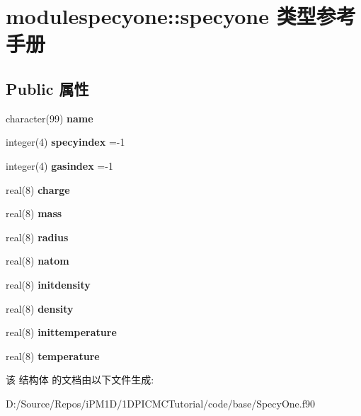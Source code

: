 \hypertarget{structmodulespecyone_1_1specyone}{}\section{modulespecyone\+::specyone 类型参考手册}
\label{structmodulespecyone_1_1specyone}
\subsection*{Public 属性}
\begin{DoxyCompactItemize}
\item 
\mbox{\label{structmodulespecyone_1_1specyone_a3733ccd68807479c6b2f7400ef594d37}} 
character(99) {\bfseries name}
\item 
\mbox{\label{structmodulespecyone_1_1specyone_a79663ae3062555bb388a821fa2537dc9}} 
integer(4) {\bfseries specyindex} =-\/1
\item 
\mbox{\label{structmodulespecyone_1_1specyone_a37247f42a8c35a92f2b876a5275b24d5}} 
integer(4) {\bfseries gasindex} =-\/1
\item 
\mbox{\label{structmodulespecyone_1_1specyone_a575a9d4bc6a978d0908fba7a64d488a9}} 
real(8) {\bfseries charge}
\item 
\mbox{\label{structmodulespecyone_1_1specyone_a6c23f4e565bbaaa8728d89838d121e73}} 
real(8) {\bfseries mass}
\item 
\mbox{\label{structmodulespecyone_1_1specyone_a4c80efd92716e5bc2744b7a190b76c54}} 
real(8) {\bfseries radius}
\item 
\mbox{\label{structmodulespecyone_1_1specyone_af80e21e01664fae97530f37afebf217d}} 
real(8) {\bfseries natom}
\item 
\mbox{\label{structmodulespecyone_1_1specyone_af45755b0be5882bfb2ca22b0a3fa175f}} 
real(8) {\bfseries initdensity}
\item 
\mbox{\label{structmodulespecyone_1_1specyone_a9fb89e33af94df1f91f441891415bc1d}} 
real(8) {\bfseries density}
\item 
\mbox{\label{structmodulespecyone_1_1specyone_a3b2851e02b85dcd3d91b90978f35472a}} 
real(8) {\bfseries inittemperature}
\item 
\mbox{\label{structmodulespecyone_1_1specyone_a24420692f99f4e9d26d751ab435d986a}} 
real(8) {\bfseries temperature}
\end{DoxyCompactItemize}


该 结构体 的文档由以下文件生成\+:\begin{DoxyCompactItemize}
\item 
D\+:/\+Source/\+Repos/i\+P\+M1\+D/1\+D\+P\+I\+C\+M\+C\+Tutorial/code/base/Specy\+One.\+f90\end{DoxyCompactItemize}
